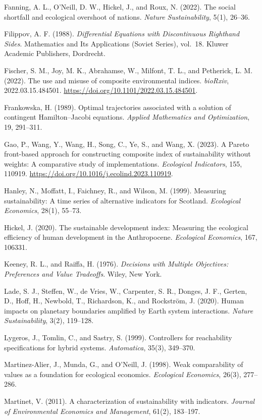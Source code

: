 \documentclass[3p,11pt]{elsarticle}
\begin{document}
Fanning, A. L., O'Neill, D. W., Hickel, J., and Roux, N. (2022). The social shortfall and ecological overshoot of nations. \emph{Nature Sustainability}, 5(1), 26--36.

Filippov, A. F. (1988). \emph{Differential Equations with Discontinuous Righthand Sides}. Mathematics and Its Applications (Soviet Series), vol.~18. Kluwer Academic Publishers, Dordrecht.

Fischer, S. M., Joy, M. K., Abrahamse, W., Milfont, T. L., and Petherick, L. M. (2022). The use and misuse of composite environmental indices. \emph{bioRxiv}, 2022.03.15.484501. \url{https://doi.org/10.1101/2022.03.15.484501}.

Frankowska, H. (1989). Optimal trajectories associated with a solution
of contingent Hamilton--Jacobi equations. \emph{Applied Mathematics and
Optimization}, 19, 291--311.

Gao, P., Wang, Y., Wang, H., Song, C., Ye, S., and Wang, X. (2023). A Pareto front-based approach for constructing composite index of sustainability without weights: A comparative study of implementations. \emph{Ecological Indicators}, 155, 110919. \url{https://doi.org/10.1016/j.ecolind.2023.110919}.

Hanley, N., Moffatt, I., Faichney, R., and Wilson, M. (1999). Measuring
sustainability: A time series of alternative indicators for Scotland.
\emph{Ecological Economics}, 28(1), 55--73.

Hickel, J. (2020). The sustainable development index: Measuring the
ecological efficiency of human development in the Anthropocene.
\emph{Ecological Economics}, 167, 106331.

Keeney, R. L., and Raiffa, H. (1976). \emph{Decisions with Multiple
Objectives: Preferences and Value Tradeoffs}. Wiley, New York.

Lade, S. J., Steffen, W., de Vries, W., Carpenter, S. R., Donges, J. F., Gerten, D., Hoff, H., Newbold, T., Richardson, K., and Rockstr\"om, J. (2020). Human impacts on planetary boundaries amplified by Earth system interactions. \emph{Nature Sustainability}, 3(2), 119--128.

Lygeros, J., Tomlin, C., and Sastry, S. (1999). Controllers for
reachability specifications for hybrid systems. \emph{Automatica},
35(3), 349--370.

Martinez-Alier, J., Munda, G., and O'Neill, J. (1998). Weak
comparability of values as a foundation for ecological economics.
\emph{Ecological Economics}, 26(3), 277--286.

Martinet, V. (2011). A characterization of sustainability with
indicators. \emph{Journal of Environmental Economics and Management},
61(2), 183--197.
\end{document}
